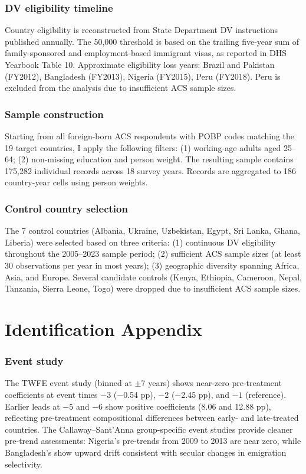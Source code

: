 \documentclass[12pt]{article}
\begin{document}
\subsubsection*{DV eligibility timeline} Country eligibility is reconstructed from State Department DV instructions published annually. The 50,000 threshold is based on the trailing five-year sum of family-sponsored and employment-based immigrant visas, as reported in DHS Yearbook Table 10. Approximate eligibility loss years: Brazil and Pakistan (FY2012), Bangladesh (FY2013), Nigeria (FY2015), Peru (FY2018). Peru is excluded from the analysis due to insufficient ACS sample sizes.

\subsubsection*{Sample construction} Starting from all foreign-born ACS respondents with POBP codes matching the 19 target countries, I apply the following filters: (1) working-age adults aged 25--64; (2) non-missing education and person weight. The resulting sample contains 175,282 individual records across 18 survey years. Records are aggregated to 186 country-year cells using person weights.

\subsubsection*{Control country selection} The 7 control countries (Albania, Ukraine, Uzbekistan, Egypt, Sri Lanka, Ghana, Liberia) were selected based on three criteria: (1) continuous DV eligibility throughout the 2005--2023 sample period; (2) sufficient ACS sample sizes (at least 30 observations per year in most years); (3) geographic diversity spanning Africa, Asia, and Europe. Several candidate controls (Kenya, Ethiopia, Cameroon, Nepal, Tanzania, Sierra Leone, Togo) were dropped due to insufficient ACS sample sizes.

\section{Identification Appendix}

\subsubsection*{Event study} The TWFE event study (binned at $\pm$7 years) shows near-zero pre-treatment coefficients at event times $-3$ ($-$0.54 pp), $-2$ ($-$2.45 pp), and $-1$ (reference). Earlier leads at $-5$ and $-6$ show positive coefficients (8.06 and 12.88 pp), reflecting pre-treatment compositional differences between early- and late-treated countries. The Callaway--Sant'Anna group-specific event studies provide cleaner pre-trend assessments: Nigeria's pre-trends from 2009 to 2013 are near zero, while Bangladesh's show upward drift consistent with secular changes in emigration selectivity.
\end{document}
